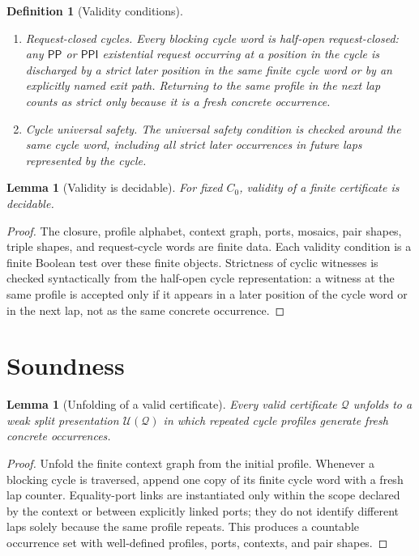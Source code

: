 \documentclass[11pt]{article}
\newtheorem{lemma}[theorem]{Lemma}
\newtheorem{definition}[theorem]{Definition}
\newcommand{\PP}{\mathsf{PP}}
\newcommand{\PPI}{\mathsf{PPI}}
\newcommand{\Q}{\mathcal Q}
\newcommand{\U}{\mathcal U}
\begin{document}
\begin{definition}[Validity conditions]
\begin{enumerate}[label=(V\arabic*)]
\item \emph{Request-closed cycles.}  Every blocking cycle word is half-open request-closed: any \(\PP\) or \(\PPI\) existential request occurring at a position in the cycle is discharged by a strict later position in the same finite cycle word or by an explicitly named exit path.  Returning to the same profile in the next lap counts as strict only because it is a fresh concrete occurrence.
\item \emph{Cycle universal safety.}  The universal safety condition is checked around the same cycle word, including all strict later occurrences in future laps represented by the cycle.
\end{enumerate}
\end{definition}

\begin{lemma}[Validity is decidable]
For fixed \(C_0\), validity of a finite certificate is decidable.
\end{lemma}

\begin{proof}
The closure, profile alphabet, context graph, ports, mosaics, pair shapes, triple shapes, and request-cycle words are finite data.  Each validity condition is a finite Boolean test over these finite objects.  Strictness of cyclic witnesses is checked syntactically from the half-open cycle representation: a witness at the same profile is accepted only if it appears in a later position of the cycle word or in the next lap, not as the same concrete occurrence.
\end{proof}

\section{Soundness}

\begin{lemma}[Unfolding of a valid certificate]\label{lem:unfold}
Every valid certificate \(\Q\) unfolds to a weak split presentation \(\U(\Q)\) in which repeated cycle profiles generate fresh concrete occurrences.
\end{lemma}

\begin{proof}
Unfold the finite context graph from the initial profile.  Whenever a blocking cycle is traversed, append one copy of its finite cycle word with a fresh lap counter.  Equality-port links are instantiated only within the scope declared by the context or between explicitly linked ports; they do not identify different laps solely because the same profile repeats.  This produces a countable occurrence set with well-defined profiles, ports, contexts, and pair shapes.
\end{proof}
\end{document}
